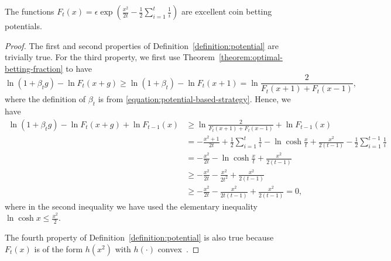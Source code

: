 \begin{theorem}
\label{thm:exp_x2}
The functions $F_t(x)=\epsilon\exp(\tfrac{x^2}{2t}- \frac{1}{2}\sum_{i=1}^t \tfrac{1}{i})$ are excellent coin betting potentials.
\end{theorem}
%
\begin{proof}
The first and second properties of Definition~\ref{definition:potential} are
trivially true.  For the third property, we first use
Theorem~\ref{theorem:optimal-betting-fraction} to have
\[
\ln(1+\beta_t g) - \ln F_t(x+g) \geq \ln(1+\beta_t) - \ln F_t(x+1) = \ln \frac{2}{F_t(x+1)+F_t(x-1)},
\]
where the definition of $\beta_t$ is from \eqref{equation:potential-based-strategy}.
Hence, we have
\begin{align*}
\ln(1+\beta_t g) - \ln F_t(x+g)  +\ln F_{t-1}(x)
&\geq \ln \frac{2}{F_t(x+1)+F_t(x-1)} +\ln F_{t-1}(x) \\
&= -\frac{x^2+1}{2t} +\frac{1}{2}\sum_{i=1}^t \frac{1}{i} -\ln \cosh \frac{x}{t} + \frac{x^2}{2(t-1)} - \frac{1}{2}\sum_{i=1}^{t-1} \frac{1}{i}\\
&= -\frac{x^2}{2t} -\ln \cosh \frac{x}{t} + \frac{x^2}{2(t-1)}\\
&\geq -\frac{x^2}{2t}  -\frac{x^2}{2 t^2} + \frac{x^2}{2(t-1)} \\
&\geq -\frac{x^2}{2t}  -\frac{x^2}{2 t (t-1)} + \frac{x^2}{2(t-1)} =0,
\end{align*}
where in the second inequality we have used the elementary inequality $\ln
\cosh x \leq \tfrac{x^2}{2}$.

The fourth property of Definition~\ref{definition:potential} is also true
because $F_t(x)$ is of the form $h(x^2)$ with $h(\cdot)$
convex~\cite{McMahan-Orabona-2014}.
\end{proof}

